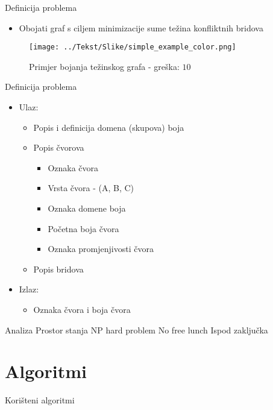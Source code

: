 \documentclass[utf8]{beamer}
\begin{document}
\begin{frame}{Definicija problema}
	\begin{itemize}
		\item Obojati graf s ciljem minimizacije sume težina konfliktnih bridova
	\end{itemize}
	\begin{figure}[h]
  \caption{Primjer bojanja težinskog grafa - greška: $10$}
  \centering
    \texttt{[image: ../Tekst/Slike/simple\_example\_color.png]}
\end{figure}
\end{frame}

\begin{frame}{Definicija problema}
	\begin{itemize}
		\item Ulaz:
			\begin{itemize}
				\item Popis i definicija domena (skupova) boja
				\pause
				\item Popis čvorova
					\begin{itemize}
						\item Oznaka čvora
						\item Vrsta čvora - (A, B, C)
						\item Oznaka domene boja
						\item Početna boja čvora
						\item Oznaka promjenjivosti čvora
					\end{itemize}
				\pause
				\item Popis bridova
			\end{itemize}
		\pause
		\item Izlaz:
			\begin{itemize}
				\item Oznaka čvora i boja čvora
			\end{itemize}
	\end{itemize}
\end{frame}



\begin{frame}{Analiza}
Prostor stanja
NP hard problem
No free lunch
Ispod zaključka
\end{frame}

\section{Algoritmi}
\begin{frame}{Korišteni algoritmi}
\end{frame}
\end{document}
